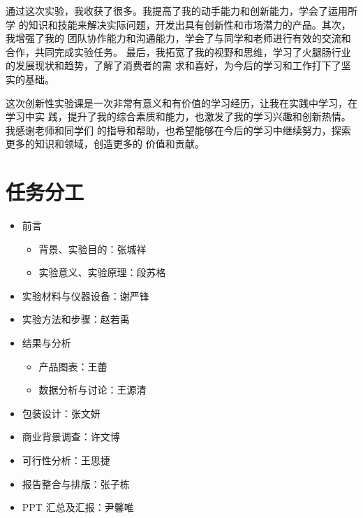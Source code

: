 \documentclass[UTF8]{ctexart}
\begin{document}
		通过这次实验，我收获了很多。我提高了我的动手能力和创新能力，学会了运用所学
		的知识和技能来解决实际问题，开发出具有创新性和市场潜力的产品。其次，我增强了我的
		团队协作能力和沟通能力，学会了与同学和老师进行有效的交流和合作，共同完成实验任务。
		最后，我拓宽了我的视野和思维，学习了火腿肠行业的发展现状和趋势，了解了消费者的需
		求和喜好，为今后的学习和工作打下了坚实的基础。

		这次创新性实验课是一次非常有意义和有价值的学习经历，让我在实践中学习，在学习中实
		践，提升了我的综合素质和能力，也激发了我的学习兴趣和创新热情。我感谢老师和同学们
		的指导和帮助，也希望能够在今后的学习中继续努力，探索更多的知识和领域，创造更多的
		价值和贡献。

	\section*{任务分工}
	\begin{itemize}
		\item 前言
			\begin{itemize}
				\item 背景、实验目的：张城祥
				\item 实验意义、实验原理：段苏格
			\end{itemize}
		\item 实验材料与仪器设备：谢严锋
		\item 实验方法和步骤：赵若禹
		\item 结果与分析
			\begin{itemize}
				\item 产品图表：王蕾
				\item 数据分析与讨论：王源清
			\end{itemize}
		\item 包装设计：张文妍
		\item 商业背景调查：许文博
		\item 可行性分析：王思捷
		\item 报告整合与排版：张子栋
		\item PPT 汇总及汇报：尹馨唯
	\end{itemize}
\end{document}
